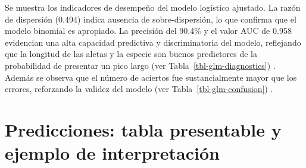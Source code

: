 \documentclass[
  spanish,
  11pt,
  a4paper,
  DIV=11,
  numbers=noendperiod]{scrartcl}
\begin{document}
Se muestra los indicadores de desempeño del modelo logístico ajustado.
La razón de dispersión (0.494) indica ausencia de sobre-dispersión, lo
que confirma que el modelo binomial es apropiado. La precisión del
90.4\% y el valor AUC de 0.958 evidencian una alta capacidad predictiva
y discriminatoria del modelo, reflejando que la longitud de las aletas y
la especie son buenos predictores de la probabilidad de presentar un
pico largo (ver Tabla~\ref{tbl-glm-diagnostics}) . Además se observa que
el número de aciertos fue sustancialmente mayor que los errores,
reforzando la validez del modelo (ver Tabla~\ref{tbl-glm-confusion}) .

\section{Predicciones: tabla presentable y ejemplo de
interpretación}\label{predicciones-tabla-presentable-y-ejemplo-de-interpretaciuxf3n}
\end{document}
